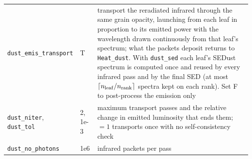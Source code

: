 \documentclass[english,a4paper]{my_memo}
\newcommand{\code}[1]{\texttt{#1}}
\begin{document}
{\begin{longtable}{llp{6.8cm}}
\code{dust\_emis\_transport} & T & transport the reradiated infrared through the same grain opacity, launching from each leaf in proportion to its emitted power with the wavelength drawn continuously from that leaf's spectrum; what the packets deposit returns to \code{Heat\_dust}.  With \code{dust\_sed} each leaf's SEDust spectrum is computed once and reused by every infrared pass and by the final SED (at most $\lceil n_{\rm leaf}/n_{\rm rank}\rceil$ spectra kept on each rank).  Set F to post-process the emission only \\
\code{dust\_niter}, \code{dust\_tol} & 2, 1e-3 & maximum transport passes and the relative change in emitted luminosity that ends them; $=1$ transports once with no self-consistency check \\
\code{dust\_no\_photons} & 1e6 & infrared packets per pass \\
\end{longtable}
}
\end{document}
